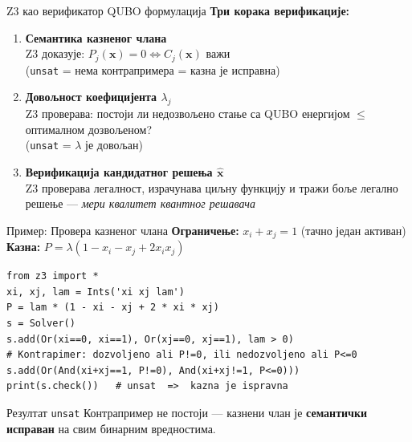 \documentclass[aspectratio=169]{beamer}
\begin{document}
\begin{frame}{Z3 као верификатор QUBO формулација}
  \textbf{Три корака верификације:}

  \bigskip
  \begin{enumerate}
    \item \textbf{Семантика казненог члана}\\
          Z3 доказује: $P_j(\mathbf{x})=0 \iff C_j(\mathbf{x})$ важи\\
          (\texttt{unsat} = нема контрапримера = казна је исправна)

    \bigskip
    \item \textbf{Довољност коефицијента $\lambda_j$}\\
          Z3 проверава: постоји ли недозвољено стање са QUBO енергијом
          $\leq$ оптималном дозвољеном?\\
          (\texttt{unsat} = $\lambda$ је довољан)

    \bigskip
    \item \textbf{Верификација кандидатног решења $\hat{\mathbf{x}}$}\\
          Z3 проверава легалност, израчунава циљну функцију и тражи
          боље легално решење — \emph{мери квалитет квантног решавача}
  \end{enumerate}
\end{frame}

\begin{frame}[fragile]{Пример: Провера казненог члана}
  \textbf{Ограничење:} $x_i + x_j = 1$ \quad (тачно један активан)\\
  \textbf{Казна:} $P = \lambda(1 - x_i - x_j + 2x_ix_j)$

  \begin{lstlisting}[style=pysmall]
from z3 import *
xi, xj, lam = Ints('xi xj lam')
P = lam * (1 - xi - xj + 2 * xi * xj)
s = Solver()
s.add(Or(xi==0, xi==1), Or(xj==0, xj==1), lam > 0)
# Kontrapimer: dozvoljeno ali P!=0, ili nedozvoljeno ali P<=0
s.add(Or(And(xi+xj==1, P!=0), And(xi+xj!=1, P<=0)))
print(s.check())   # unsat  =>  kazna je ispravna
  \end{lstlisting}

  \medskip
  \begin{exampleblock}{Резултат \texttt{unsat}}
    Контрапример не постоји — казнени члан је \textbf{семантички исправан}
    на свим бинарним вредностима.
  \end{exampleblock}
\end{frame}
\end{document}
